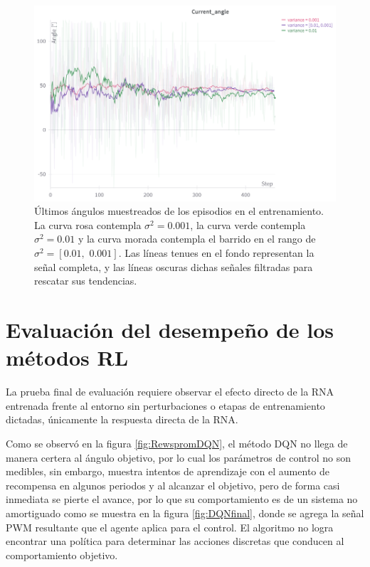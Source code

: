 \begin{figure}[hh]
	\centering
	\includegraphics[scale=0.5]{fig/new/PPOentrenadosang.png}
	\caption{Últimos ángulos muestreados de los episodios en el entrenamiento. La curva rosa contempla $\sigma^2=0.001$, la curva verde contempla $\sigma^2=0.01$ y la curva morada contempla el barrido en el rango de $\sigma^2=[0.01, \,\, 0.001]$. Las líneas tenues en el fondo representan la señal completa, y las líneas oscuras dichas señales filtradas para rescatar sus tendencias.}
	\label{fig:Angleprom}
\end{figure}


\section{Evaluación del desempeño de los métodos RL}

La prueba final de evaluación requiere observar el efecto directo de la RNA entrenada frente al entorno sin perturbaciones o etapas de entrenamiento dictadas, únicamente la respuesta directa de la RNA.

Como se observó en la figura \ref{fig:RewspromDQN}, el método DQN no llega de manera certera al ángulo objetivo, por lo cual los parámetros de control no son medibles, sin embargo, muestra intentos de aprendizaje con el aumento de recompensa en algunos periodos y al alcanzar el objetivo, pero de forma casi inmediata se pierte el avance, por lo que su comportamiento es de un sistema no amortiguado como se muestra en la figura \ref{fig:DQNfinal}, donde se agrega la señal PWM resultante que el agente aplica para el control. El algoritmo no logra encontrar una política para determinar las acciones discretas que conducen al comportamiento objetivo.
 
